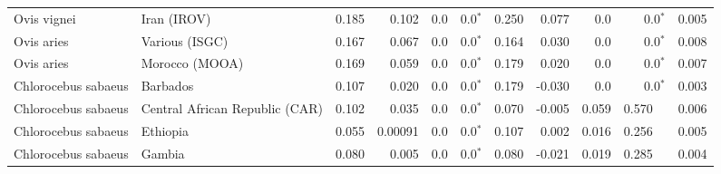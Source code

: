 \begin{center}
\begin{adjustbox}{width = 1\textwidth}
\begin{tabular}{|l|l|r|r|r|r|r|r|r|r|r|}
         Ovis vignei &                     Iran (IROV) &                 0.185 &                                0.102 &                  0.0 &                             0.0$\bm{^*}$ &                 0.250 &                                0.077 &                  0.0 &                             0.0$\bm{^*}$ &              0.005 \\
          Ovis aries &                  Various (ISGC) &                 0.167 &                                0.067 &                  0.0 &                             0.0$\bm{^*}$ &                 0.164 &                                0.030 &                  0.0 &                             0.0$\bm{^*}$ &              0.008 \\
          Ovis aries &                  Morocco (MOOA) &                 0.169 &                                0.059 &                  0.0 &                             0.0$\bm{^*}$ &                 0.179 &                                0.020 &                  0.0 &                             0.0$\bm{^*}$ &              0.007 \\
 Chlorocebus sabaeus &                        Barbados &                 0.107 &                                0.020 &                  0.0 &                             0.0$\bm{^*}$ &                 0.179 &                               -0.030 &                  0.0 &                             0.0$\bm{^*}$ &              0.003 \\
 Chlorocebus sabaeus &  Central African Republic (CAR) &                 0.102 &                                0.035 &                  0.0 &                             0.0$\bm{^*}$ &                 0.070 &                               -0.005 &                0.059 &                                  0.570~~ &              0.006 \\
 Chlorocebus sabaeus &                        Ethiopia &                 0.055 &                              0.00091 &                  0.0 &                             0.0$\bm{^*}$ &                 0.107 &                                0.002 &                0.016 &                                  0.256~~ &              0.005 \\
 Chlorocebus sabaeus &                          Gambia &                 0.080 &                                0.005 &                  0.0 &                             0.0$\bm{^*}$ &                 0.080 &                               -0.021 &                0.019 &                                  0.285~~ &              0.004 \\

\end{tabular}
\end{adjustbox}
\end{center}
